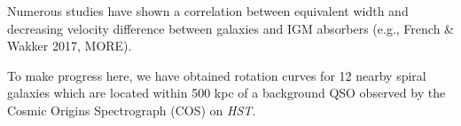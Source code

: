 \documentclass[iop]{emulateapj-rtx4}
\begin{document}

Numerous studies have shown a correlation between equivalent width and decreasing velocity difference between galaxies and IGM absorbers (e.g., French \& Wakker 2017, MORE).

To make progress here, we have obtained rotation curves for 12 nearby spiral galaxies which are located within 500 kpc of a background QSO observed by the Cosmic Origins Spectrograph (COS) on \textit{HST}. 
\end{document}
